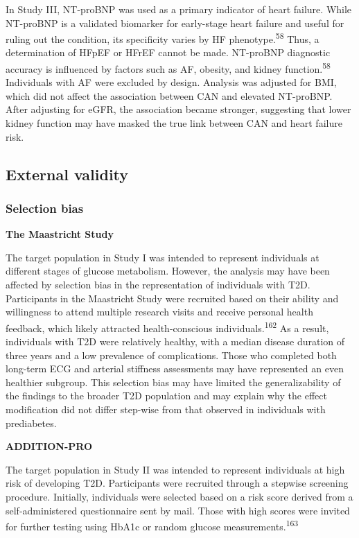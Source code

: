 \documentclass[
  a4paper,
  headsepline=true,
  open=left]{scrbook}
\begin{document}
In Study III, NT-proBNP was used as a primary indicator of heart
failure. While NT-proBNP is a validated biomarker for early-stage heart
failure and useful for ruling out the condition, its specificity varies
by HF phenotype.\textsuperscript{58} Thus, a determination of HFpEF or
HFrEF cannot be made. NT-proBNP diagnostic accuracy is influenced by
factors such as AF, obesity, and kidney function.\textsuperscript{58}
Individuals with AF were excluded by design. Analysis was adjusted for
BMI, which did not affect the association between CAN and elevated
NT-proBNP. After adjusting for eGFR, the association became stronger,
suggesting that lower kidney function may have masked the true link
between CAN and heart failure risk.

\hypertarget{external-validity}{%
\subsection{External validity}\label{external-validity}}

\hypertarget{selection-bias}{%
\subsubsection{Selection bias}\label{selection-bias}}

\textbf{The Maastricht Study}

The target population in Study I was intended to represent individuals
at different stages of glucose metabolism. However, the analysis may
have been affected by selection bias in the representation of
individuals with T2D. Participants in the Maastricht Study were
recruited based on their ability and willingness to attend multiple
research visits and receive personal health feedback, which likely
attracted health-conscious individuals.\textsuperscript{162} As a
result, individuals with T2D were relatively healthy, with a median
disease duration of three years and a low prevalence of complications.
Those who completed both long-term ECG and arterial stiffness
assessments may have represented an even healthier subgroup. This
selection bias may have limited the generalizability of the findings to
the broader T2D population and may explain why the effect modification
did not differ step-wise from that observed in individuals with
prediabetes.

\textbf{ADDITION-PRO}

The target population in Study II was intended to represent individuals
at high risk of developing T2D. Participants were recruited through a
stepwise screening procedure. Initially, individuals were selected based
on a risk score derived from a self-administered questionnaire sent by
mail. Those with high scores were invited for further testing using
HbA1c or random glucose measurements.\textsuperscript{163}
\end{document}

